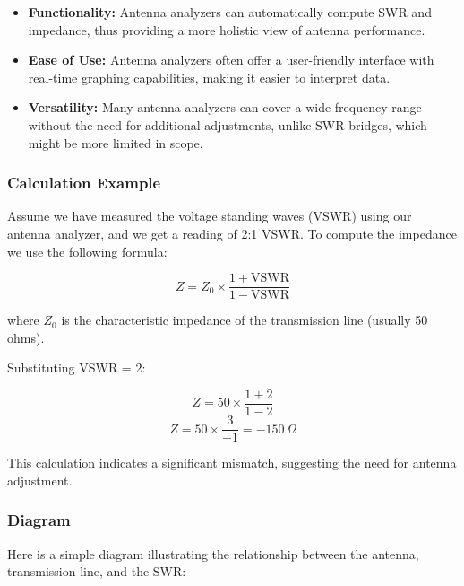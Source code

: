 \begin{itemize}
    \item \textbf{Functionality:} Antenna analyzers can automatically compute SWR and impedance, thus providing a more holistic view of antenna performance.
    \item \textbf{Ease of Use:} Antenna analyzers often offer a user-friendly interface with real-time graphing capabilities, making it easier to interpret data.
    \item \textbf{Versatility:} Many antenna analyzers can cover a wide frequency range without the need for additional adjustments, unlike SWR bridges, which might be more limited in scope.
\end{itemize}

\subsubsection{Calculation Example}

Assume we have measured the voltage standing waves (VSWR) using our antenna analyzer, and we get a reading of 2:1 VSWR. To compute the impedance we use the following formula:

\[
Z = Z_0 \times \frac{1 + \text{VSWR}}{1 - \text{VSWR}}
\]

where \( Z_0 \) is the characteristic impedance of the transmission line (usually 50 ohms).

Substituting VSWR = 2:

\[
Z = 50 \times \frac{1 + 2}{1 - 2}
\]
\[
Z = 50 \times \frac{3}{-1} = -150 \, \Omega
\]

This calculation indicates a significant mismatch, suggesting the need for antenna adjustment.

\subsubsection{Diagram}

Here is a simple diagram illustrating the relationship between the antenna, transmission line, and the SWR:

